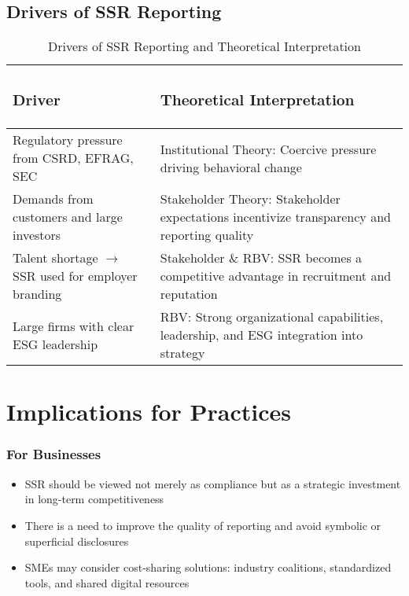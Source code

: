 \subsection{Drivers of SSR Reporting}

\begin{table}[H]
    \centering
    \caption{Drivers of SSR Reporting and Theoretical Interpretation}
    \begin{tabular}{p{6cm}|p{8cm}}
        \subsubsection{Driver} & \subsubsection{Theoretical Interpretation} \\
        \hline
        Regulatory pressure from CSRD, EFRAG, SEC & Institutional Theory: Coercive pressure driving behavioral change \\
        \hline
        Demands from customers and large investors & Stakeholder Theory: Stakeholder expectations incentivize transparency and reporting quality \\
        \hline
        Talent shortage $\rightarrow$ SSR used for employer branding & Stakeholder \& RBV: SSR becomes a competitive advantage in recruitment and reputation \\
        \hline
        Large firms with clear ESG leadership & RBV: Strong organizational capabilities, leadership, and ESG integration into strategy    \end{tabular}
\end{table}

\section{Implications for Practices}
\subsubsection{For Businesses}
\begin{itemize}
    \item SSR should be viewed not merely as compliance but as a strategic investment in long-term competitiveness \parencite{Barker2025}
    \item There is a need to improve the quality of reporting and avoid symbolic or superficial disclosures \parencite{Nava2023}
    \item SMEs may consider cost-sharing solutions: industry coalitions, standardized tools, and shared digital resources \parencite{Najjar2024}
\end{itemize}

